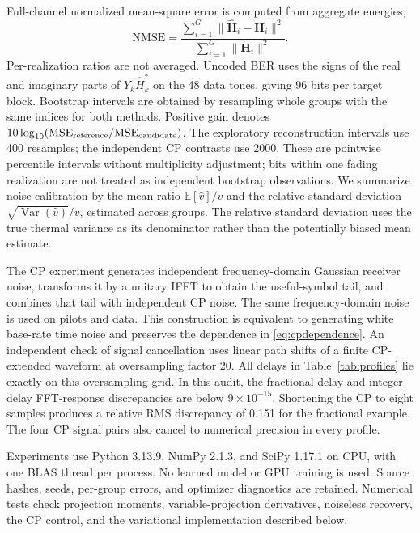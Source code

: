 Full-channel normalized mean-square error is computed from aggregate energies,
\begin{equation}
 \mathrm{NMSE}=\frac{\sum_{i=1}^{G}\|\widehat{\mathbf H}_i-\mathbf H_i\|^2}
                    {\sum_{i=1}^{G}\|\mathbf H_i\|^2}.
 \label{eq:nmse}
\end{equation}
Per-realization ratios are not averaged. Uncoded BER uses the signs
of the real and imaginary parts of $Y_k\widehat H_k^*$ on the 48 data tones,
giving 96 bits per target block. Bootstrap intervals are obtained by resampling
whole groups with the same indices for both methods. Positive gain denotes
$10\log_{10}(\mathrm{MSE}_{\rm reference}/\mathrm{MSE}_{\rm candidate})$.
The exploratory reconstruction intervals use 400 resamples; the independent
CP contrasts use 2000. These are pointwise percentile intervals without
multiplicity adjustment; bits within one fading realization are not treated
as independent bootstrap observations. We summarize noise calibration by
the mean ratio $\mathbb E[\widehat v]/v$ and the relative
standard deviation $\sqrt{\operatorname{Var}(\widehat v)}/v$, estimated across
groups. The relative standard deviation uses the true thermal variance as its
denominator rather than the potentially biased mean estimate.

The CP experiment generates independent frequency-domain Gaussian receiver
noise, transforms it by a unitary IFFT to obtain the useful-symbol tail,
and combines that tail with independent CP noise. The same frequency-domain
noise is used on pilots and data. This construction is equivalent to generating
white base-rate time noise and preserves the dependence in
\eqref{eq:cpdependence}. An independent check of signal cancellation uses
linear path shifts of a finite CP-extended waveform at oversampling factor
20. All delays in Table~\ref{tab:profiles} lie exactly on this oversampling
grid. In this audit, the fractional-delay and integer-delay FFT-response
discrepancies are below $9\times10^{-15}$. Shortening the CP to eight samples
produces a relative RMS discrepancy of 0.151 for the fractional example.
The four CP signal pairs also cancel to numerical precision in every profile.

Experiments use Python 3.13.9, NumPy 2.1.3, and SciPy 1.17.1 on CPU, with
one BLAS thread per process. No learned model or GPU training is used. Source
hashes, seeds, per-group errors, and optimizer diagnostics are retained. Numerical
tests check projection moments, variable-projection derivatives, noiseless
recovery, the CP control, and the variational implementation described below.

